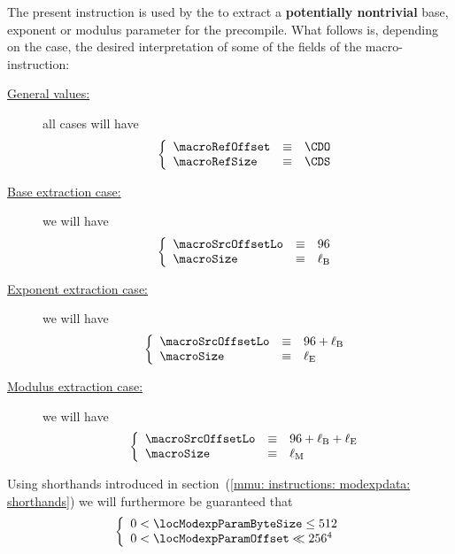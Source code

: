 The present instruction is used by the \hubMod{} to extract a \textbf{potentially nontrivial} base, exponent or modulus parameter for the  precompile.
What follows is, depending on the case, the desired interpretation of some of the fields of the macro-instruction:
\begin{description}
	\item[\underline{General values:}]
		all cases will have
		\[
			\left\{ \begin{array}{lcl}
				\macroRefOffset  & \equiv & \CDO \\
				\macroRefSize    & \equiv & \CDS \\
			\end{array} \right.
		\]
	\item[\underline{Base extraction case:}] 
		we will have
		\[
			\left\{ \begin{array}{lcl}
				\macroSrcOffsetLo  & \equiv & 96            \\
				\macroSize         & \equiv & \ell_\text{B} \\
			\end{array} \right.
		\]
	\item[\underline{Exponent extraction case:}] 
		we will have
		\[
			\left\{ \begin{array}{lcl}
				\macroSrcOffsetLo  & \equiv & 96 + \ell_\text{B} \\
				\macroSize         & \equiv & \ell_\text{E}      \\
			\end{array} \right.
		\]
	\item[\underline{Modulus extraction case:}] 
		we will have
		\[
			\left\{ \begin{array}{lcl}
				\macroSrcOffsetLo  & \equiv & 96 + \ell_\text{B} + \ell_\text{E} \\
				\macroSize         & \equiv & \ell_\text{M}                      \\
			\end{array} \right.
		\]
\end{description}
Using shorthands introduced in section~(\ref{mmu: instructions: modexpdata: shorthands}) we will furthermore be guaranteed that
\[
	\left\{ \begin{array}{l}
		0 < \locModexpParamByteSize \leq 512    \\
		0 < \locModexpParamOffset        \ll 256^4 \\
	\end{array} \right.
\]
